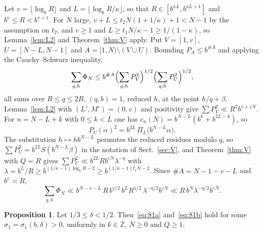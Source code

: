 \documentclass[11pt]{amsart}
\makeatletter
\theoremstyle{definition}
\newtheorem{proposition}[theorem]{Proposition}
\numberwithin{equation}{section}
\renewenvironment{proof}[1][\proofname]{\par\pushQED{\qed}\normalfont\topsep6\p@\@plus6\p@\relax\trivlist\item[\hskip\labelsep\upshape#1.]\ignorespaces}{\popQED\endtrivlist\@endpefalse}
\newcommand{\Z}{\mathbb{Z}}
\makeatother
\begin{document}
\begin{proof}
Let $v=\lfloor\log_bR\rfloor$ and $L=\lfloor\log_bR/\kappa\rfloor$, so that $R\in[b^{\kappa L},b^{\kappa L+1}]$ and $b^v\le R<b^{v+1}$. For $N$ large, $v+L\le t_2N(1+1/\kappa)+1<N-1$ by the assumption on $t_2$, and $v\ge1$ and $L\ge t_1N/\kappa-1\ge1/(1-\kappa)$, so Lemma~\ref{lem:L2} and Theorem~\ref{thm:V} apply. Put $V=[1,v]$, $U=[N-L,N-1]$ and $A=[1,N)\setminus(V\cup U)$. Bounding $P_A\le b^{\#A}$ and applying the Cauchy--Schwarz inequality,
\[
\sum_{q,h}\Phi_N\le b^{\#A}\Bigl(\sum_{q,h}P_V^2\Bigr)^{1/2}\Bigl(\sum_{q,h}P_U^2\Bigr)^{1/2},
\]
all sums over $R\le q\le2R$, $(q,b)=1$, reduced $h$, at the point $h/q+\beta$. Lemma~\ref{lem:L2} with $(L',M')=(0,v)$ and positivity give $\sum P_V^2\ll R^2b^{v+\varepsilon N}$. For $n=N-L+k$ with $0\le k<L$ one has $c_n(N)=b^{N-L}(b^k+b^{2L-k})$, so
\[
P_U(\alpha)^2=b^{2L}\,\Pi_L\bigl(b^{N-L}\alpha\bigr).
\]
The substitution $h\mapsto hb^{N-L}$ permutes the reduced residues modulo $q$, so $\sum P_U^2=b^{2L}S(b^{N-L}\beta)$ in the notation of Sect.~\ref{sec:V}, and Theorem~\ref{thm:V} with $Q=R$ gives $\sum P_U^2\ll b^{2L}Rb^{\varepsilon N}\lambda^{-\eta}$ with $\lambda=b^L/R\ge b^{(1/\kappa-1)\log_bR-2}\ge b^{(1/\kappa-1)t_1N-2}$. Since $\#A=N-1-v-L$ and $b^v\asymp R$,
\[
\sum_{q,h}\Phi_N\ll b^{N-v-L}\,R\,b^{v/2}\,b^{L}R^{1/2}\,\lambda^{-\eta/2}b^{\varepsilon N}\ll R\,b^N\lambda^{-\eta/2}b^{\varepsilon N}.
\]
\end{proof}

\begin{proposition}\label{prop:replace}
Let $1/3\le\delta<1/2$. Then~\eqref{eq:81a} and~\eqref{eq:81b} hold for some $\sigma_1=\sigma_1(b,\delta)>0$, uniformly in $k\in\Z$, $N\ge0$ and $Q\ge1$.
\end{proposition}
\end{document}
